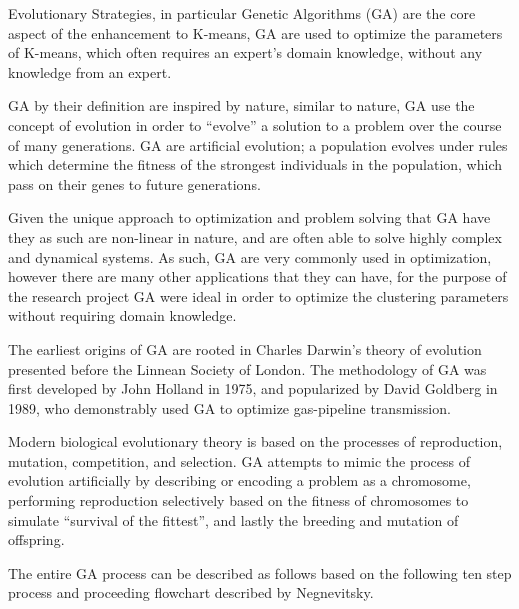 \documentclass{article}
\begin{document}
Evolutionary Strategies, in particular Genetic Algorithms (GA) are the core aspect of the enhancement to K-means, GA are used to optimize the parameters of K-means, which often requires an expert's domain knowledge, without any knowledge from an expert.

GA by their definition are inspired by nature, similar to nature, GA use the concept of evolution in order to ``evolve'' a solution to a problem over the course of many generations. GA are artificial evolution; a population evolves under rules which determine the fitness of the strongest individuals in the population, which pass on their genes to future generations\cite{golberg1989genetic, haupt2004practical}.

Given the unique approach to optimization and problem solving that GA have they as such are non-linear in nature, and are often able to solve highly complex and dynamical systems\cite{negnevitsky2011artificial}. As such, GA are very commonly used in optimization, however there are many other applications that they can have, for the purpose of the research project GA were ideal in order to optimize the clustering parameters without requiring domain knowledge.

The earliest origins of GA are rooted in Charles Darwin’s theory of evolution presented before the Linnean Society of London. The methodology of GA was first developed by John Holland in 1975, and popularized by David Goldberg in 1989, who demonstrably used GA to optimize gas-pipeline transmission\cite{golberg1989genetic}.

Modern biological evolutionary theory is based on the processes of reproduction, mutation, competition, and selection. GA attempts to mimic the process of evolution artificially by describing or encoding a problem as a chromosome, performing reproduction selectively based on the fitness of chromosomes to simulate ``survival of the fittest'', and lastly the breeding and mutation of offspring\cite{golberg1989genetic, negnevitsky2011artificial}.

The entire GA process can be described as follows based on the following ten step process and proceeding flowchart described by Negnevitsky\cite{negnevitsky2011artificial}.
\end{document}
